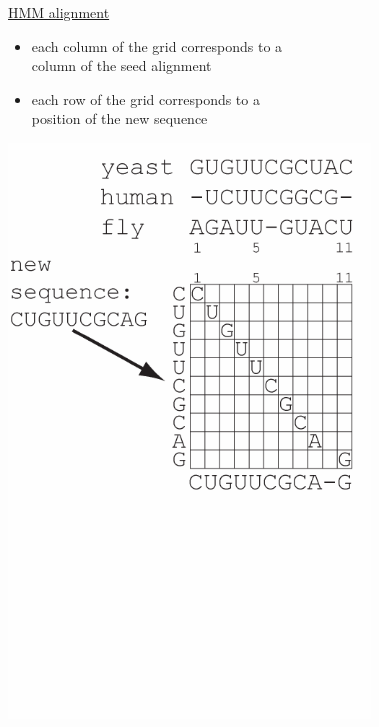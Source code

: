 \documentclass[landscape]{slides}
\begin{document}
\begin{slide}
\begin{minipage}{6in}
\begin{itemize}
\end{itemize}
\small
\hspace{0.3in}
\underline{HMM alignment}%
\begin{itemize}
\item
each column of the grid corresponds to a \\ column
of the seed alignment
\item
each row of the grid corresponds to a \\ position of the new sequence
\end{itemize}
\vspace{3in}
\end{minipage}
\begin{minipage}{4in}
\begin{center}
\includegraphics[height=6in]{figs/hmm_alignment2_layer2}
\end{center}
\vspace{1.5in}
\end{minipage}
\end{slide}
\end{document}
